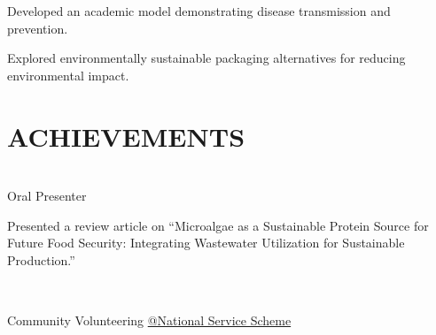 \documentclass[]{kajalverse-resume}
\begin{document}
\begin{minipage}[t]{0.66\textwidth}
\sectionsep

\begin{tightemize}
\item Developed an academic model demonstrating disease transmission and prevention.
\end{tightemize}
\sectionsep

\begin{tightemize}
\item Explored environmentally sustainable packaging alternatives for reducing environmental impact.
\end{tightemize}

\section{ACHIEVEMENTS}

 \\
 \textbullet{} Oral Presenter
 
 \textbullet{} Presented a review article on “Microalgae as a Sustainable Protein Source for Future Food Security: Integrating Wastewater Utilization for Sustainable Production.”
\subsection{}
 \\
Community Volunteering \textbullet{} \href{https://nss.gov.in/}{@National Service Scheme } \\
\end{minipage}
\end{document}
